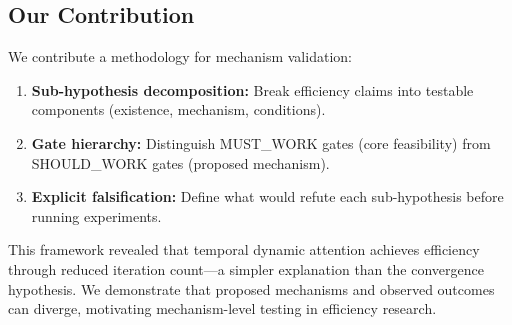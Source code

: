 \subsection{Our Contribution}

We contribute a methodology for mechanism validation:

\begin{enumerate}
    \item \textbf{Sub-hypothesis decomposition:} Break efficiency claims into testable components (existence, mechanism, conditions).
    \item \textbf{Gate hierarchy:} Distinguish MUST\_WORK gates (core feasibility) from SHOULD\_WORK gates (proposed mechanism).
    \item \textbf{Explicit falsification:} Define what would refute each sub-hypothesis before running experiments.
\end{enumerate}

This framework revealed that temporal dynamic attention achieves efficiency through reduced iteration count---a simpler explanation than the convergence hypothesis. We demonstrate that proposed mechanisms and observed outcomes can diverge, motivating mechanism-level testing in efficiency research.
